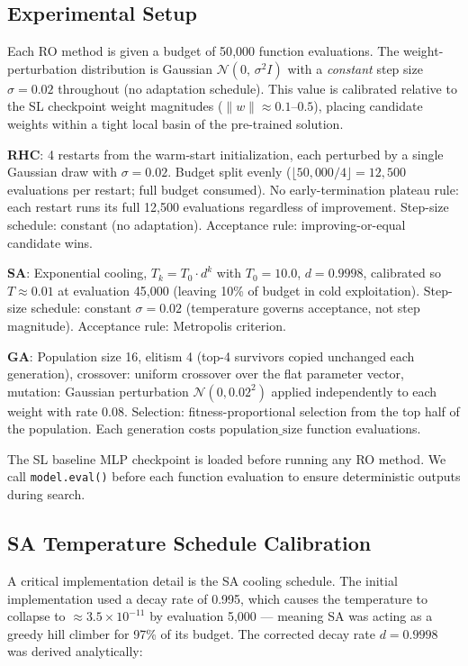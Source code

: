 \documentclass[letterpaper, 10 pt, conference]{ieeeconf}
\begin{document}
\subsection{Experimental Setup}

Each RO method is given a budget of 50{,}000 function evaluations. The weight-perturbation distribution is Gaussian $\mathcal{N}(0,\, \sigma^2 I)$ with a \emph{constant} step size $\sigma = 0.02$ throughout (no adaptation schedule). This value is calibrated relative to the SL checkpoint weight magnitudes ($\|w\| \approx 0.1$--$0.5$), placing candidate weights within a tight local basin of the pre-trained solution.

\textbf{RHC}: 4 restarts from the warm-start initialization, each perturbed by a single Gaussian draw with $\sigma = 0.02$. Budget split evenly ($\lfloor 50{,}000/4 \rfloor = 12{,}500$ evaluations per restart; full budget consumed). No early-termination plateau rule: each restart runs its full 12{,}500 evaluations regardless of improvement. Step-size schedule: constant (no adaptation). Acceptance rule: improving-or-equal candidate wins.

\textbf{SA}: Exponential cooling, $T_k = T_0 \cdot d^k$ with $T_0 = 10.0$, $d = 0.9998$, calibrated so $T \approx 0.01$ at evaluation 45{,}000 (leaving 10\% of budget in cold exploitation). Step-size schedule: constant $\sigma = 0.02$ (temperature governs acceptance, not step magnitude). Acceptance rule: Metropolis criterion.

\textbf{GA}: Population size 16, elitism 4 (top-4 survivors copied unchanged each generation), crossover: uniform crossover over the flat parameter vector, mutation: Gaussian perturbation $\mathcal{N}(0, 0.02^2)$ applied independently to each weight with rate 0.08. Selection: fitness-proportional selection from the top half of the population. Each generation costs $\text{population\_size}$ function evaluations.

The SL baseline MLP checkpoint is loaded before running any RO method. We call \texttt{model.eval()} before each function evaluation to ensure deterministic outputs during search.

\subsection{SA Temperature Schedule Calibration}

A critical implementation detail is the SA cooling schedule. The initial implementation used a decay rate of 0.995, which causes the temperature to collapse to $\approx 3.5 \times 10^{-11}$ by evaluation 5{,}000 --- meaning SA was acting as a greedy hill climber for 97\% of its budget. The corrected decay rate $d = 0.9998$ was derived analytically:
\end{document}
